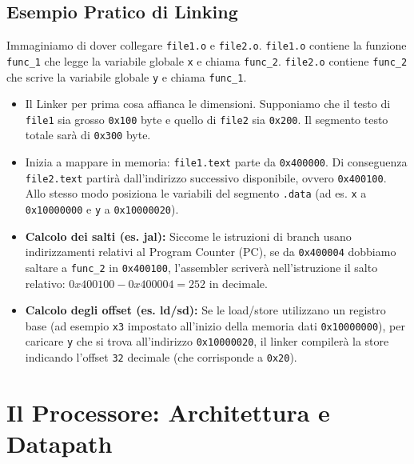 \documentclass[12pt, a4paper]{article}
\begin{document}
\subsection{Esempio Pratico di Linking}
Immaginiamo di dover collegare \texttt{file1.o} e \texttt{file2.o}. 
\texttt{file1.o} contiene la funzione \texttt{func\_1} che legge la variabile globale \texttt{x} e chiama \texttt{func\_2}.
\texttt{file2.o} contiene \texttt{func\_2} che scrive la variabile globale \texttt{y} e chiama \texttt{func\_1}.
\begin{itemize}
    \item Il Linker per prima cosa affianca le dimensioni. Supponiamo che il testo di \texttt{file1} sia grosso \texttt{0x100} byte e quello di \texttt{file2} sia \texttt{0x200}. Il segmento testo totale sarà di \texttt{0x300} byte.
    \item Inizia a mappare in memoria: \texttt{file1.text} parte da \texttt{0x400000}. Di conseguenza \texttt{file2.text} partirà dall'indirizzo successivo disponibile, ovvero \texttt{0x400100}. Allo stesso modo posiziona le variabili del segmento \texttt{.data} (ad es. \texttt{x} a \texttt{0x10000000} e \texttt{y} a \texttt{0x10000020}).
    \item \textbf{Calcolo dei salti (es. jal):} Siccome le istruzioni di branch usano indirizzamenti relativi al Program Counter (PC), se da \texttt{0x400004} dobbiamo saltare a \texttt{func\_2} in \texttt{0x400100}, l'assembler scriverà nell'istruzione il salto relativo: $0x400100 - 0x400004 = 252$ in decimale.
    \item \textbf{Calcolo degli offset (es. ld/sd):} Se le load/store utilizzano un registro base (ad esempio \texttt{x3} impostato all'inizio della memoria dati \texttt{0x10000000}), per caricare \texttt{y} che si trova all'indirizzo \texttt{0x10000020}, il linker compilerà la store indicando l'offset \texttt{32} decimale (che corrisponde a \texttt{0x20}).
\end{itemize}


\section{Il Processore: Architettura e Datapath}
\end{document}
